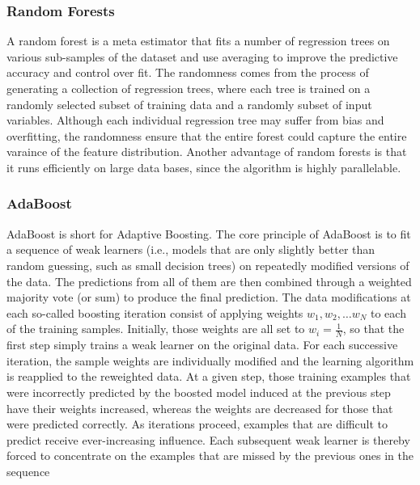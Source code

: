 \subsubsection{Random Forests}
\label{ssub:random_forests}
A random forest is a meta estimator that fits a number of regression trees on various sub-samples of the dataset and use averaging to improve the predictive accuracy and control over fit.
The randomness comes from the process of generating a collection of regression trees, where each tree is trained on a randomly selected subset of training data and a randomly subset of input variables.
Although each individual regression tree may suffer from bias and overfitting, the randomness ensure that the entire forest could capture the entire varaince of the feature distribution.
Another advantage of random forests is that it runs efficiently on large data bases, since the algorithm is highly parallelable.

\subsubsection{AdaBoost}
\label{ssub:adaboost}
AdaBoost is short for Adaptive Boosting.
The core principle of AdaBoost is to fit a sequence of weak learners (i.e., models that are only slightly better than random guessing, such as small decision trees) on repeatedly modified versions of the data. 
The predictions from all of them are then combined through a weighted majority vote (or sum) to produce the final prediction. 
The data modifications at each so-called boosting iteration consist of applying weights $w_1, w_2, \ldots w_N$ to each of the training samples. 
Initially, those weights are all set to $w_i = \frac{1}{N}$, so that the first step simply trains a weak learner on the original data. 
For each successive iteration, the sample weights are individually modified and the learning algorithm is reapplied to the reweighted data. 
At a given step, those training examples that were incorrectly predicted by the boosted model induced at the previous step have their weights increased, whereas the weights are decreased for those that were predicted correctly. 
As iterations proceed, examples that are difficult to predict receive ever-increasing influence. 
Each subsequent weak learner is thereby forced to concentrate on the examples that are missed by the previous ones in the sequence

